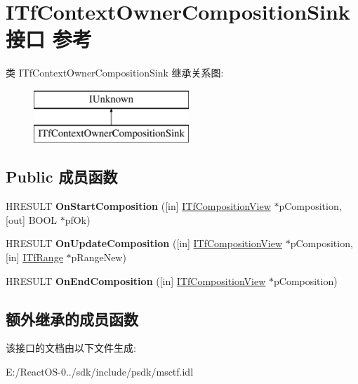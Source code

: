 \hypertarget{interface_i_tf_context_owner_composition_sink}{}\section{I\+Tf\+Context\+Owner\+Composition\+Sink接口 参考}
\label{interface_i_tf_context_owner_composition_sink}
类 I\+Tf\+Context\+Owner\+Composition\+Sink 继承关系图\+:\begin{figure}[H]
\begin{center}
\leavevmode
\includegraphics[height=2.000000cm]{interface_i_tf_context_owner_composition_sink}
\end{center}
\end{figure}
\subsection*{Public 成员函数}
\begin{DoxyCompactItemize}
\item 
\mbox{\label{interface_i_tf_context_owner_composition_sink_a786bb1df248b293ff23eddeb500e7241}} 
H\+R\+E\+S\+U\+LT {\bfseries On\+Start\+Composition} (\mbox{[}in\mbox{]} \hyperlink{interface_i_tf_composition_view}{I\+Tf\+Composition\+View} $\ast$p\+Composition, \mbox{[}out\mbox{]} B\+O\+OL $\ast$pf\+Ok)
\item 
\mbox{\label{interface_i_tf_context_owner_composition_sink_ac6caeb0dd371e0c0b30c309ce6fb929e}} 
H\+R\+E\+S\+U\+LT {\bfseries On\+Update\+Composition} (\mbox{[}in\mbox{]} \hyperlink{interface_i_tf_composition_view}{I\+Tf\+Composition\+View} $\ast$p\+Composition, \mbox{[}in\mbox{]} \hyperlink{interface_i_tf_range}{I\+Tf\+Range} $\ast$p\+Range\+New)
\item 
\mbox{\label{interface_i_tf_context_owner_composition_sink_aba2716c48ee24822c40ae315ce4dd953}} 
H\+R\+E\+S\+U\+LT {\bfseries On\+End\+Composition} (\mbox{[}in\mbox{]} \hyperlink{interface_i_tf_composition_view}{I\+Tf\+Composition\+View} $\ast$p\+Composition)
\end{DoxyCompactItemize}
\subsection*{额外继承的成员函数}


该接口的文档由以下文件生成\+:\begin{DoxyCompactItemize}
\item 
E\+:/\+React\+O\+S-\/0../sdk/include/psdk/msctf.\+idl\end{DoxyCompactItemize}
